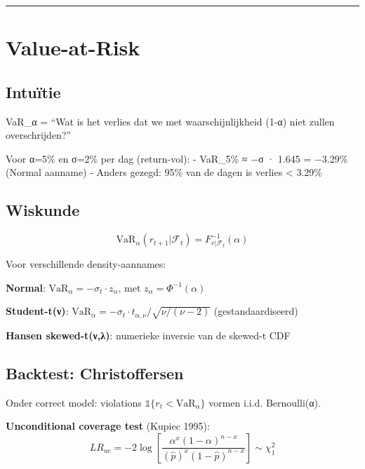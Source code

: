 \documentclass[11pt,a4paper]{article}
\begin{document}
\begin{center}\rule{0.5\linewidth}{0.5pt}\end{center}

\hypertarget{value-at-risk}{%
\section{Value-at-Risk}\label{value-at-risk}}

\hypertarget{intuuxeftie-9}{%
\subsection{Intuïtie}\label{intuuxeftie-9}}

VaR\_α = ``Wat is het verlies dat we met waarschijnlijkheid (1-α) niet zullen overschrijden?''

Voor α=5\% en σ=2\% per dag (return-vol):
- VaR\_5\% ≈ −σ · 1.645 = −3.29\% (Normal aanname)
- Anders gezegd: 95\% van de dagen is verlies \textless{} 3.29\%

\hypertarget{wiskunde-3}{%
\subsection{Wiskunde}\label{wiskunde-3}}

\[\text{VaR}_\alpha(r_{t+1} | \mathcal{F}_t) = F^{-1}_{r|\mathcal{F}_t}(\alpha)\]

Voor verschillende density-aannames:

\textbf{Normal}: \(\text{VaR}_\alpha = -\sigma_t \cdot z_\alpha\), met \(z_\alpha = \Phi^{-1}(\alpha)\)

\textbf{Student-t(ν)}: \(\text{VaR}_\alpha = -\sigma_t \cdot t_{\alpha,\nu} / \sqrt{\nu/(\nu-2)}\) (gestandaardiseerd)

\textbf{Hansen skewed-t(ν,λ)}: numerieke inversie van de skewed-t CDF

\hypertarget{backtest-christoffersen}{%
\subsection{Backtest: Christoffersen}\label{backtest-christoffersen}}

Onder correct model: violations \(\mathbb{1}\{r_t < \text{VaR}_\alpha\}\) vormen i.i.d. Bernoulli(α).

\textbf{Unconditional coverage test} (Kupiec 1995):
\[LR_{uc} = -2\log\left[\frac{\alpha^x (1-\alpha)^{n-x}}{(\hat p)^x (1-\hat p)^{n-x}}\right] \sim \chi^2_1\]
\end{document}
